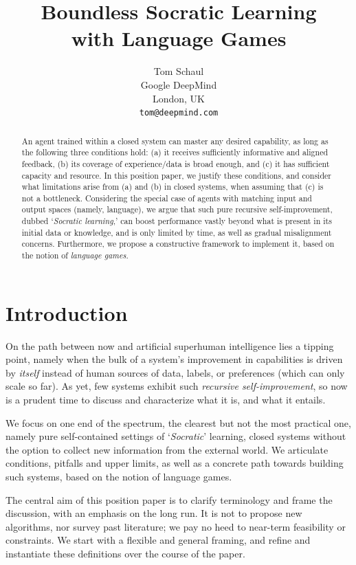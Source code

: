 \documentclass[dvipsnames]{article} %
\title{Boundless Socratic Learning 
\\with Language Games
}
\author{Tom Schaul\\
Google DeepMind\\
London, UK\\
\texttt{tom@deepmind.com} \\
}
\begin{document}
\maketitle

\begin{abstract}
An agent trained within a closed system can master any desired capability, as long as the following three conditions hold: (a) it receives sufficiently informative and aligned feedback, (b) its coverage of experience/data is broad enough, and (c) it has sufficient capacity and resource.
In this position paper, we justify these conditions, and consider what limitations arise from (a) and (b) in closed systems, when assuming that (c) is not a bottleneck.
Considering the special case of agents with matching input and output spaces (namely, language), we argue that such pure recursive self-improvement, dubbed `\emph{Socratic learning},' can boost performance vastly beyond what is present in its initial data or knowledge, and is only limited by time, as well as gradual misalignment concerns. 
Furthermore, we propose a constructive framework to implement it, based on the notion of \emph{language games}.
\end{abstract}


\section{Introduction}


On the path between now and artificial superhuman intelligence \citep[ASI;][]{morris2023levels,grace2024thousands} lies a tipping point, namely when the bulk of a system's improvement in capabilities is driven by \emph{itself} instead of human sources of data, labels, or preferences (which can only scale so far).
As yet, few systems exhibit such \emph{recursive self-improvement}, so now is a prudent time to discuss and characterize what it is, and what it entails.

We focus on one end of the spectrum, the clearest but not the most practical one, 
namely pure self-contained settings of `\emph{Socratic}' learning, closed systems without the option to collect new information from the external world.
We articulate conditions, pitfalls and upper limits, as well as a concrete path towards building such systems, based on the notion of language games.

The central aim of this position paper is to clarify terminology and frame the discussion, with an emphasis on the long run.
It is not to propose new algorithms, nor survey past literature; we pay no heed to near-term feasibility or constraints.
We start with a flexible and general framing, and refine and instantiate these definitions over the course of the paper.
\end{document}
